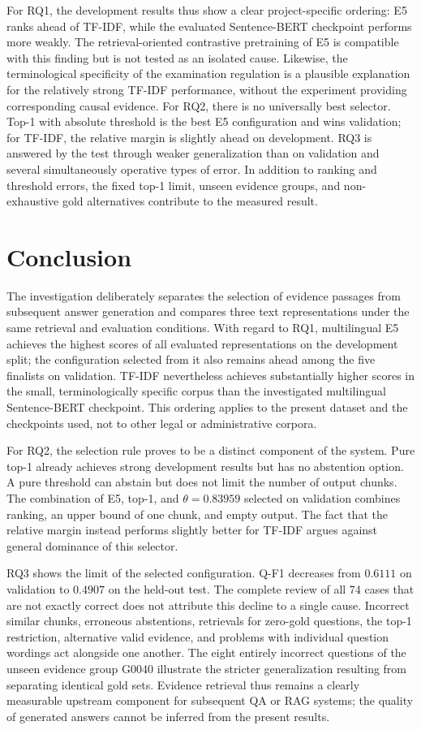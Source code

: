\documentclass[11pt]{article}
\begin{document}
For RQ1, the development results thus show a clear project-specific ordering: E5 ranks ahead of TF-IDF, while the evaluated Sentence-BERT checkpoint performs more weakly. The retrieval-oriented contrastive pretraining of E5 is compatible with this finding but is not tested as an isolated cause. Likewise, the terminological specificity of the examination regulation is a plausible explanation for the relatively strong TF-IDF performance, without the experiment providing corresponding causal evidence. For RQ2, there is no universally best selector. Top-1 with absolute threshold is the best E5 configuration and wins validation; for TF-IDF, the relative margin is slightly ahead on development. RQ3 is answered by the test through weaker generalization than on validation and several simultaneously operative types of error. In addition to ranking and threshold errors, the fixed top-1 limit, unseen evidence groups, and non-exhaustive gold alternatives contribute to the measured result.


\section{Conclusion}

The investigation deliberately separates the selection of evidence passages from subsequent answer generation and compares three text representations under the same retrieval and evaluation conditions. With regard to RQ1, multilingual E5 achieves the highest scores of all evaluated representations on the development split; the configuration selected from it also remains ahead among the five finalists on validation. TF-IDF nevertheless achieves substantially higher scores in the small, terminologically specific corpus than the investigated multilingual Sentence-BERT checkpoint. This ordering applies to the present dataset and the checkpoints used, not to other legal or administrative corpora.

For RQ2, the selection rule proves to be a distinct component of the system. Pure top-1 already achieves strong development results but has no abstention option. A pure threshold can abstain but does not limit the number of output chunks. The combination of E5, top-1, and $\theta=0.83959$ selected on validation combines ranking, an upper bound of one chunk, and empty output. The fact that the relative margin instead performs slightly better for TF-IDF argues against general dominance of this selector.

RQ3 shows the limit of the selected configuration. Q-F1 decreases from $0.6111$ on validation to $0.4907$ on the held-out test. The complete review of all 74 cases that are not exactly correct does not attribute this decline to a single cause. Incorrect similar chunks, erroneous abstentions, retrievals for zero-gold questions, the top-1 restriction, alternative valid evidence, and problems with individual question wordings act alongside one another. The eight entirely incorrect questions of the unseen evidence group G0040 illustrate the stricter generalization resulting from separating identical gold sets. Evidence retrieval thus remains a clearly measurable upstream component for subsequent QA or RAG systems; the quality of generated answers cannot be inferred from the present results.
\end{document}
